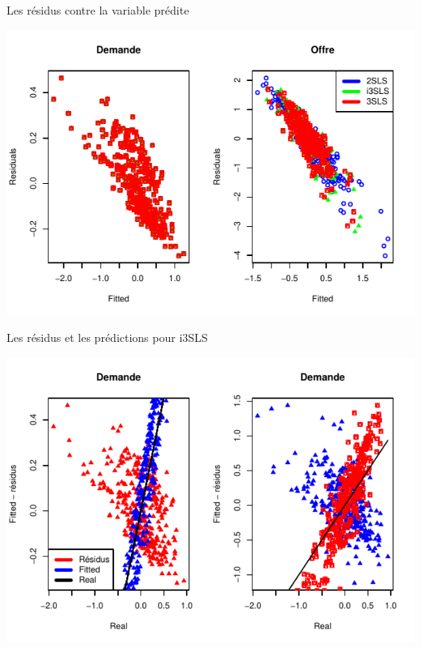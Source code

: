 \documentclass[11pt,ignorenonframetext,]{beamer}
\begin{document}
\begin{frame}{Les résidus contre la variable prédite}
\protect\hypertarget{les-residus-contre-la-variable-predite-1}{}

\includegraphics{Presentation_files/figure-beamer/unnamed-chunk-60-1.pdf}

\end{frame}

\begin{frame}{Les résidus et les prédictions pour i3SLS}
\protect\hypertarget{les-residus-et-les-predictions-pour-i3sls}{}

\includegraphics{Presentation_files/figure-beamer/unnamed-chunk-61-1.pdf}

\end{frame}
\end{document}
